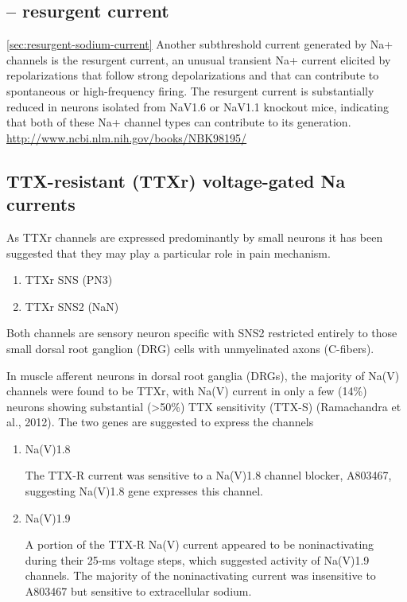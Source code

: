 \subsection{-- resurgent current}


\ref{sec:resurgent-sodium-current}
Another subthreshold current generated by Na+ channels is the resurgent current,
an unusual transient Na+ current elicited by repolarizations that follow strong
depolarizations and that can contribute to spontaneous or high-frequency firing.
The resurgent current is substantially reduced in neurons isolated from NaV1.6
or NaV1.1 knockout mice, indicating that both of these Na+ channel types can
contribute to its generation.
\url{http://www.ncbi.nlm.nih.gov/books/NBK98195/}

\subsection{TTX-resistant (TTXr) voltage-gated Na currents}
\label{sec:Na-current-TTX-resistant}

As TTXr channels are expressed predominantly by small neurons it has been
suggested that they may play a particular role in pain mechanism.

\begin{enumerate}
  \item TTXr SNS (PN3)
  
  \item TTXr SNS2 (NaN)
\end{enumerate}
Both  channels  are  sensory  neuron  specific
with  SNS2  restricted  entirely  to  those  small  dorsal  root
ganglion (DRG) cells with unmyelinated axons (C-fibers).

In muscle afferent neurons in dorsal root ganglia (DRGs), the majority of Na(V)
channels were found to be TTXr, with Na(V) current in only a few (14\%) neurons
showing substantial (>50\%) TTX sensitivity (TTX-S) (Ramachandra et al., 2012).
The two genes are suggested to express the channels
\begin{enumerate}
  \item Na(V)1.8

The TTX-R current was sensitive to a Na(V)1.8 channel blocker, A803467,
suggesting Na(V)1.8 gene expresses this channel.
  
  \item Na(V)1.9


A portion of the TTX-R Na(V) current appeared to be noninactivating during their 
25-ms voltage steps, which suggested activity of Na(V)1.9 channels.
The majority of the noninactivating current was insensitive to A803467 but
sensitive to extracellular sodium. 
\end{enumerate}


